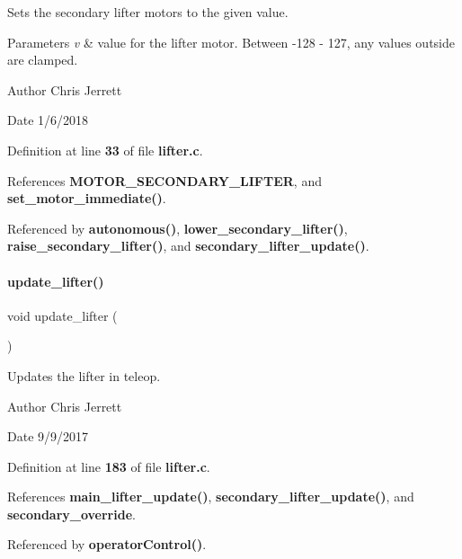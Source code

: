 Sets the secondary lifter motors to the given value. 


\begin{DoxyParams}{Parameters}
{\em v} & value for the lifter motor. Between -\/128 -\/ 127, any values outside are clamped. \\
\hline
\end{DoxyParams}
\begin{DoxyAuthor}{Author}
Chris Jerrett 
\end{DoxyAuthor}
\begin{DoxyDate}{Date}
1/6/2018 
\end{DoxyDate}


Definition at line \textbf{ 33} of file \textbf{ lifter.\+c}.



References \textbf{ M\+O\+T\+O\+R\+\_\+\+S\+E\+C\+O\+N\+D\+A\+R\+Y\+\_\+\+L\+I\+F\+T\+ER}, and \textbf{ set\+\_\+motor\+\_\+immediate()}.



Referenced by \textbf{ autonomous()}, \textbf{ lower\+\_\+secondary\+\_\+lifter()}, \textbf{ raise\+\_\+secondary\+\_\+lifter()}, and \textbf{ secondary\+\_\+lifter\+\_\+update()}.

\mbox{\label{lifter_8h_a59bb7413777ca16aba124aaedf95c79b}} 
\paragraph{update\+\_\+lifter()}
{\footnotesize\ttfamily void update\+\_\+lifter (\begin{DoxyParamCaption}{ }\end{DoxyParamCaption})}



Updates the lifter in teleop. 

\begin{DoxyAuthor}{Author}
Chris Jerrett 
\end{DoxyAuthor}
\begin{DoxyDate}{Date}
9/9/2017 
\end{DoxyDate}


Definition at line \textbf{ 183} of file \textbf{ lifter.\+c}.



References \textbf{ main\+\_\+lifter\+\_\+update()}, \textbf{ secondary\+\_\+lifter\+\_\+update()}, and \textbf{ secondary\+\_\+override}.



Referenced by \textbf{ operator\+Control()}.

